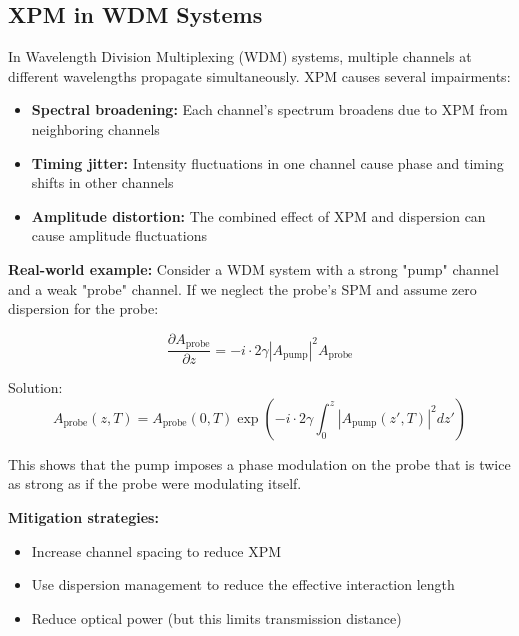 \documentclass[a4paper, 11pt]{article}
\begin{document}
\subsection{XPM in WDM Systems}

In Wavelength Division Multiplexing (WDM) systems, multiple channels at different wavelengths propagate simultaneously. XPM causes several impairments:

\begin{itemize}[leftmargin=*]
    \item \textbf{Spectral broadening:} Each channel's spectrum broadens due to XPM from neighboring channels
    \item \textbf{Timing jitter:} Intensity fluctuations in one channel cause phase and timing shifts in other channels
    \item \textbf{Amplitude distortion:} The combined effect of XPM and dispersion can cause amplitude fluctuations
\end{itemize}

\begin{physical}
\textbf{Real-world example:} Consider a WDM system with a strong "pump" channel and a weak "probe" channel. If we neglect the probe's SPM and assume zero dispersion for the probe:

\begin{equation}
    \frac{\partial A_{\text{probe}}}{\partial z} = -i \cdot 2\gamma |A_{\text{pump}}|^2 A_{\text{probe}}
\end{equation}

Solution:
\begin{equation}
    A_{\text{probe}}(z,T) = A_{\text{probe}}(0,T) \exp\left(-i \cdot 2\gamma \int_0^z |A_{\text{pump}}(z',T)|^2 dz'\right)
\end{equation}

This shows that the pump imposes a phase modulation on the probe that is twice as strong as if the probe were modulating itself.

\textbf{Mitigation strategies:}
\begin{itemize}
    \item Increase channel spacing to reduce XPM
    \item Use dispersion management to reduce the effective interaction length
    \item Reduce optical power (but this limits transmission distance)
\end{itemize}
\end{physical}
\end{document}
